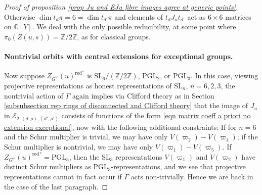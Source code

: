 \documentclass[10pt]{article}
\newcommand{\Ee}{\mathcal{E}}
\newcommand{\Z}{\mathbb{Z}}
\newcommand{\C}{\mathbb{C}}
\newcommand{\PGL}{\mathrm{PGL}}
\newcommand{\SL}{\mathrm{SL}}
\theoremstyle{definition}
\theoremstyle{remark}
\newcommand{\Zur}{Z_{G^\vee}(u)^{\mathrm{red}}}
\newcommand{\std}{\mathrm{std}}
\begin{document}
\begin{proof}[Proof of proposition \ref{prop Ju and EJu fibre images agree at generic points}]
Otherwise $\dim t_{d}\pi=6=\dim t_{d'}\pi$ and elements of $t_{d}J_ut_{d'}$ act as $6\times 6$ matrices on $\C[Y]$. We deal with the only possible reducibility, at some point where $\pi_0(Z(u,s))=\Z/2\Z$, as for classical groups.
 




%
\paragraph{Nontrivial orbits with central extensions for exceptional groups.}
Now suppose ${\Zur}^\circ$ is $\SL_6/(\Z/2\Z)$, $\PGL_2$, or $\PGL_3$. In this case, viewing projective
representations as honest representations of $\SL_n$, $n=6,2,3$, the nontrivial action of $\Gamma$
again implies via Clifford theory as in Section \ref{subsubsection rep rings of disconnected and Clifford theory} that the image of $J_u$ in 
$\Ee_{2,(d,\rho),(d',\rho')}$ consists of functions of the form 
\eqref{eqn matrix coeff a priori no extension exceptional}, now with the following additional constraints:
If for $n=6$ and the Schur multiplier is trivial, we may have only $V(\varpi_2)-V(\varpi_4)$; if the Schur multiplier is nontrivial, we may have only $V(\varpi_1)-V(\varpi_5)$. If ${\Zur}^\circ=\PGL_3$,
then the $\SL_3$ representations $V(\varpi_1)$ and $V(\varpi_2)$ have distinct 
Schur multipliers as $\PGL_3$-representations, and we see that projective
representations cannot in fact occur if $\Gamma$ acts non-trivially. Hence
we are back in the case of the last paragraph.


\end{proof}
\end{document}
